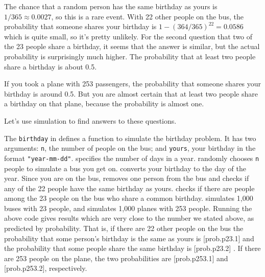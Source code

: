 The chance that a random person has the same birthday as yours is
$1/365\approx0.0027$, so this is a rare event.
With 22 other people on the bus, the probability that someone shares your
birthday is $1-(364/365)^{22}=0.0586$ which is quite small, so it's pretty unlikely. For
the second question that two of the 23 people share a birthday, it seems that
the answer is similar, but the actual probability is surprisingly much
higher. The probability that at least two people share a birthday is about 0.5.

If you took a plane with 253 passengers, the probability that someone shares
your birthday is around 0.5. But you are almost certain that at least two people
share a birthday on that plane, because the probability is almost one.


Let's use simulation to find answers to these questions.


The \lstinline{birthday} in  defines a function to simulate the birthday
problem. It has two arguments: \lstinline{n}, the number of people on the bus; and
\lstinline{yours}, your birthday in the format \lstinline{"year-mm-dd"}.  
specifies the number of days in a year.   randomly chooses \lstinline{n}
people to simulate a bus you get on.   converts your birthday to the
day of the year.  Since you are on the bus,  removes one person from
the bus and checks if any of the 22 people have the same birthday as yours.
 checks if there are people among the 23 people on the bus who share
a common birthday.   simulates 1,000 buses with 23 people, and
 simulates 1,000 planes with 253 people.
Running the above code gives
results which are very close to the number we stated above, as predicted by
probability. That is, if there are 22 other people on the bus the probability
that some person's birthday is the same as yours is
[prob.p23.1] and the probability that some people share
the same birthday is [prob.p23.2] . If there are 253 people on
the plane, the two probabilities are [prob.p253.1] and
[prob.p253.2], respectively.

